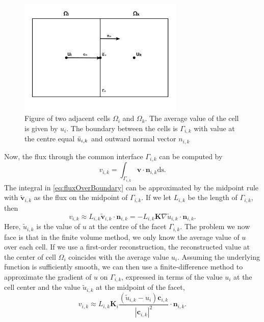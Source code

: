 \begin{figure}[H]
    \centering
    \includegraphics[width = 0.7\textwidth]{figures/grid_two_cells.pdf}
    \caption{Figure of two adjacent cells $\Omega_i$ and $\Omega_k$. The average value of the cell is given by $u_i$. The boundary between the cells is $\Gamma_{i,k}$ with value at the centre equal $\Bar{u}_{i,k}$ and outward normal vector $n_{i,k}$}
    \label{fig:gridTwoCells}
\end{figure}
Now, the flux through the common interface $\Gamma_{i,k}$ can be computed by
\begin{equation}
    v_{i,k} = \int_{\Gamma_{i,k}} \textbf{v}\cdot\textbf{n}_{i,k} \mbox{ds}. 
    \label{eq:fluxOverBoundary}
\end{equation}
The integral in \eqref{eq:fluxOverBoundary} can be approximated by the midpoint rule with $\tilde{\textbf{v}}_{i,k}$ as the flux on the midpoint of $\Gamma_{i,k}$. If we let $L_{i,k}$ be the length of $\Gamma_{i,k}$, then 
\begin{equation*}
    v_{i,k} \approx L_{i,k}\tilde{\textbf{v}}_{i,k} \cdot \textbf{n}_{i,k} = -L_{i,k}\textbf{K}\nabla \tilde{u}_{i,k} \cdot \textbf{n}_{i,k}.
\end{equation*}
Here, $\tilde{u}_{i,k}$ is the value of $u$ at the centre of the facet $\Gamma_{i,k}$. The problem we now face is that in the finite volume method, we only know the average value of $u$ over each cell. If we use a first-order reconstruction, the reconstructed value at the center of cell $\Omega_i$ coincides with the average value $u_i$. Assuming the underlying function is sufficiently smooth, we can then use a finite-difference method to approximate the gradient of $u$ on $\Gamma_{i,k}$, expressed in terms of the value $u_i$ at the cell center and the value $\tilde{u}_{i,k}$ at the midpoint of the facet,
\begin{equation*}
    v_{i,k} \approx L_{i,k}\textbf{K}_i\frac{(\tilde{u}_{i,k} - u_i)\textbf{c}_{i,k}}{|\textbf{c}_{i,k}|^2} \cdot \textbf{n}_{i,k}.
\end{equation*}
